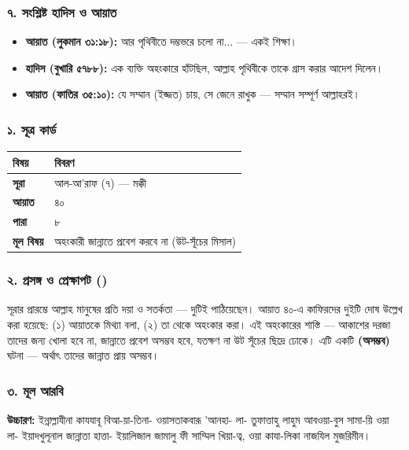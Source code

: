 \subsubsection*{৭. সংশ্লিষ্ট হাদিস ও আয়াত}

\begin{itemize}
\item \textbf{আয়াত (লুকমান ৩১:১৮):} আর পৃথিবীতে দম্ভভরে চলো না... — একই শিক্ষা।
\item \textbf{হাদিস (বুখারি ৫৭৮৮):} এক ব্যক্তি অহংকারে হাঁটছিল, আল্লাহ পৃথিবীকে তাকে গ্রাস করার আদেশ দিলেন।
\item \textbf{আয়াত (ফাতির ৩৫:১০):} যে সম্মান (ইজ্জত) চায়, সে জেনে রাখুক — সম্মান সম্পূর্ণ আল্লাহরই।
\end{itemize}
\subsubsection*{১. সূত্র কার্ড}

\begin{table}[h]\centering\small
\begin{tabular}{ll}
বিষয় & বিবরণ \\
\hline
\textbf{সূরা} & আল-আ'রাফ (৭) — মক্কী \\
\textbf{আয়াত} & ৪০ \\
\textbf{পারা} & ৮ \\
\textbf{মূল বিষয়} & অহংকারী জান্নাতে প্রবেশ করবে না (উট-সূঁচের মিসাল) \\
\hline
\end{tabular}
\end{table}

\subsubsection*{২. প্রসঙ্গ ও প্রেক্ষাপট ()}

সূরার প্রারম্ভে আল্লাহ মানুষের প্রতি দয়া ও সতর্কতা — দুটিই পাঠিয়েছেন। আয়াত ৪০-এ কাফিরদের দুইটি দোষ উল্লেখ করা হয়েছে: (১) আয়াতকে মিথ্যা বলা, (২) তা থেকে অহংকার করা। এই অহংকারের শাস্তি — আকাশের দরজা তাদের জন্য খোলা হবে না, জান্নাতে প্রবেশ অসম্ভব হবে, যতক্ষণ না উট সূঁচের ছিদ্রে ঢোকে। এটি একটি \textbf{ (অসম্ভব)} ঘটনা — অর্থাৎ তাদের জান্নাত প্রায় অসম্ভব।

\subsubsection*{৩. মূল আরবি}
\begin{center}\end{center}
\textbf{উচ্চারণ:} ইন্নাল্লাযীনা কাযযাবূ বিআ-য়া-তিনা- ওয়াসতাকবারূ 'আনহা- লা- তুফাত্তাহু লাহুম আবওয়া-বুস সামা-য়ি ওয়া লা- ইয়াদখুলূনাল জান্নাতা হাত্তা- ইয়ালিজাল জামালু ফী সাম্মিল খিয়া-ত্ব, ওয়া কাযা-লিকা নাজযিল মুজরিমীন।

